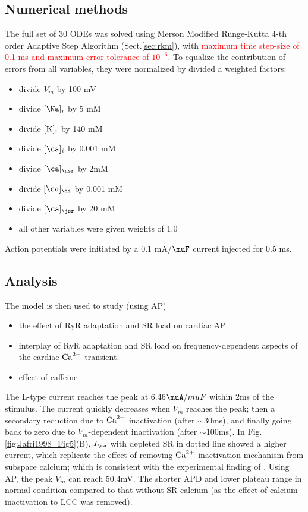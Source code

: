 \subsection{Numerical methods}

The full set of 30 ODEs was solved using Merson Modified Runge-Kutta
4-th order Adaptive Step Algorithm (Sect.\ref{sec:rkm}), with
\textcolor{red}{ maximum time step-size of 0.1 ms and maximum error
  tolerance of $10^{-6}$}. To equalize the contribution of errors from
  all variables, they were normalized by divided a weighted factors:
\begin{itemize}
\item divide $V_m$ by 100 mV
\item divide $[\Na]_i$ by 5 mM
\item divide $[\ce{K}]_i$ by 140 mM
\item divide $[\ca]_i$ by 0.001 mM
\item divide $[\ca]_\nsr$ by 2mM
\item divide $[\ca]_\ds$ by 0.001 mM
\item divide $[\ca]_\jsr$ by 20 mM
\item all other variables were given weights of 1.0
\end{itemize}

Action potentials were initiated by a 0.1 mA/$\muF$ current
injected for $0.5$ ms. 



\subsection{Analysis}
\label{sec:analysis-12}

The model is then used to study (using AP)
\begin{itemize}
\item the effect of RyR adaptation and SR load on cardiac AP
\item interplay of RyR adaptation and SR load on frequency-dependent
  aspects of the cardiac ${\text{Ca}^{2+}}$-transient.
\item effect of caffeine
\end{itemize}

The L-type current reaches the peak at 6.46$\muA/muF$ within 2ms of the
stimulus. The current quickly decreases when $V_m$ reaches the peak; then a
secondary reduction due to ${\text{Ca}^{2+}}$ inactivation (after $\sim 30$ms), and finally
going back to zero due to $V_m$-dependent inactivation (after $\sim 100$ms).
In Fig.\ref{fig:Jafri1998_Fig5}(B), $I_\ca$ with depleted SR in dotted line
showed a higher current, which replicate the effect of removing ${\text{Ca}^{2+}}$
inactivation mechanism from subspace calcium; which is consistent with the
experimental finding of \citep{grantham1996}. Using AP, the peak $V_m$ can reach
50.4mV. The shorter APD and lower plateau range in normal condition compared to
that without SR calcium (as the effect of calcium inactivation to LCC was removed).

